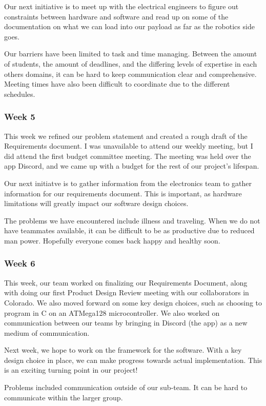 Our next initiative is to meet up with the electrical engineers to figure out constraints between hardware and 
software and read up on some of the documentation on what we can load into our \gls{payload} as far as the robotics side 
goes.

Our barriers have been limited to task and time managing. Between the amount of students, the amount of deadlines, and 
the differing levels of expertise in each others domains, it can be hard to keep communication clear and comprehensive.
Meeting times have also been difficult to coordinate due to the different schedules.

\subsubsection{Week 5}
This week we refined our problem statement and created a rough draft of the Requirements document. I was unavailable 
to attend our weekly meeting, but I did attend the first budget committee meeting. The meeting was held over the app 
Discord, and we came up with a budget for the rest of our project's lifespan.

Our next initiatve is to gather information from the electronics team to gather information for our requirements
document. This is important, as hardware limitations will greatly impact our software design choices.

The problems we have encountered include illness and traveling. When we do not have teammates available, it can be
difficult to be as productive due to reduced man power. Hopefully everyone comes back happy and healthy soon.

\subsubsection{Week 6}
This week, our team worked on finalizing our Requirements Document, along with doing our first Product Design Review 
meeting with our collaborators in Colorado. We also moved forward on some key design choices, such as choosing to 
program in C on an ATMega128 microcontroller. We also worked on communication between our teams by bringing in Discord 
(the app) as a new medium of communication.

Next week, we hope to work on the framework for the software. With a key design choice in place, we can make progress
towards actual implementation. This is an exciting turning point in our project!

Problems included communication outside of our sub-team. It can be hard to communicate within the larger group.

